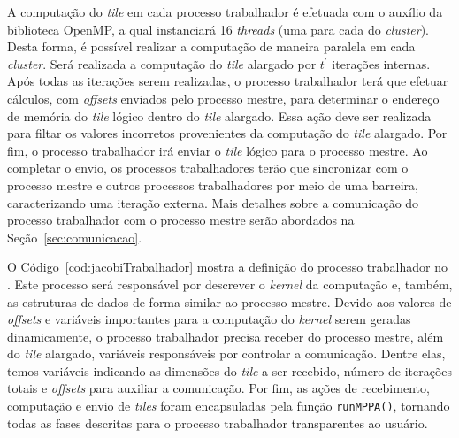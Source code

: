 A computação do \textit{tile} em cada processo trabalhador é efetuada com o auxílio da biblioteca
OpenMP, a qual instanciará 16 \textit{threads} (uma para cada \pe do \textit{cluster}).
Desta forma, é possível realizar a computação de maneira paralela em
cada \textit{cluster}. Será realizada a computação do \textit{tile} alargado por
$t^\prime$ iterações internas. Após todas as iterações serem realizadas, o
processo trabalhador terá que efetuar cálculos, com \textit{offsets} enviados
pelo processo mestre, para determinar o endereço de memória do \textit{tile}
lógico dentro do \textit{tile} alargado. Essa ação deve ser realizada para
filtar os valores incorretos provenientes da computação do \textit{tile}
alargado. Por fim, o processo trabalhador irá enviar o \textit{tile} lógico para o
processo mestre. Ao completar o envio, os processos trabalhadores terão que
sincronizar com o processo mestre e outros processos trabalhadores por meio de
uma barreira, caracterizando uma iteração externa. Mais detalhes sobre a
comunicação do processo trabalhador com o processo mestre serão abordados na
Seção~\ref{sec:comunicacao}.


%
O Código~\ref{cod:jacobiTrabalhador} mostra a definição do processo trabalhador
no \mppa. Este processo será responsável por descrever o \textit{kernel} da
computação e, também, as estruturas de dados de forma similar ao processo mestre.
Devido aos valores de \textit{offsets} e variáveis importantes para a computação
do \textit{kernel} serem geradas dinamicamente, o processo trabalhador precisa
receber do processo mestre, além do \textit{tile} alargado, variáveis
responsáveis por controlar a comunicação. Dentre elas, temos variáveis indicando
as dimensões do \textit{tile} a ser recebido, número de iterações totais e
\textit{offsets} para auxiliar a comunicação. Por fim, as ações de recebimento,
computação e envio de \textit{tiles} foram encapsuladas pela função
\texttt{runMPPA()}, tornando todas as fases descritas para o processo
trabalhador transparentes ao usuário.


